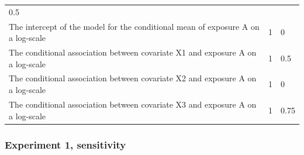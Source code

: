 \documentclass[10,a4paperpaper,]{article}
\begin{document}
\begin{longtable}[]{@{}lll@{}}
\begin{minipage}[t]{0.43\columnwidth}
0.5\strut
\end{minipage}\tabularnewline
\begin{minipage}[t]{0.37\columnwidth}\raggedright
The intercept of the model for the conditional mean of exposure A on a
log-scale\strut
\end{minipage} & \begin{minipage}[t]{0.12\columnwidth}\raggedright
1\strut
\end{minipage} & \begin{minipage}[t]{0.43\columnwidth}\raggedright
0\strut
\end{minipage}\tabularnewline
\begin{minipage}[t]{0.37\columnwidth}\raggedright
The conditional association between covariate X1 and exposure A on a
log-scale\strut
\end{minipage} & \begin{minipage}[t]{0.12\columnwidth}\raggedright
1\strut
\end{minipage} & \begin{minipage}[t]{0.43\columnwidth}\raggedright
0.5\strut
\end{minipage}\tabularnewline
\begin{minipage}[t]{0.37\columnwidth}\raggedright
The conditional association between covariate X2 and exposure A on a
log-scale\strut
\end{minipage} & \begin{minipage}[t]{0.12\columnwidth}\raggedright
1\strut
\end{minipage} & \begin{minipage}[t]{0.43\columnwidth}\raggedright
0\strut
\end{minipage}\tabularnewline
\begin{minipage}[t]{0.37\columnwidth}\raggedright
The conditional association between covariate X3 and exposure A on a
log-scale\strut
\end{minipage} & \begin{minipage}[t]{0.12\columnwidth}\raggedright
1\strut
\end{minipage} & \begin{minipage}[t]{0.43\columnwidth}\raggedright
0.75\strut
\end{minipage}\tabularnewline
\bottomrule
\end{longtable}

\subsubsection{Experiment 1, sensitivity}
\end{document}
